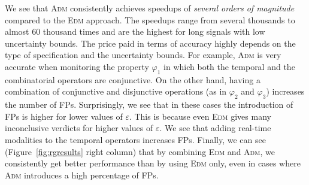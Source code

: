 We see that \textsc{Adm} consistently achieves speedups of \emph{several orders of magnitude} 
compared to the \textsc{Edm} approach.
The speedups range from several thousands to almost 60 thousand times
and are the highest for long signals with low uncertainty bounds.
The price paid in terms of accuracy highly depends on the type of specification and the uncertainty bounds.
For example, \textsc{Adm} is very accurate when monitoring the property $\varphi_1$ in which both the temporal and the combinatorial operators are conjunctive.
On the other hand, having a combination of conjunctive and disjunctive operations (as in $\varphi_{2}$ and $\varphi_{3}$) increases the number of FPs.
Surprisingly, we see that in these cases the introduction of FPs is higher for lower values of $\varepsilon$.
This is because even \textsc{Edm} gives many inconclusive verdicts for higher values of $\varepsilon$.
We see that adding real-time modalities to the temporal operators increases FPs.
Finally, we can see (Figure~\ref{fig:rgresults} right column) that by combining \textsc{Edm} and \textsc{Adm}, we consistently get better performance than by using \textsc{Edm} only, even in cases where \textsc{Adm} introduces a high percentage of FPs.




